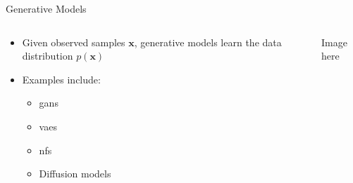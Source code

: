 \begin{frame}{Generative Models}
    \begin{columns}
        \begin{column}{0.5\linewidth}
            \small
            \begin{itemize}
                \item Given observed samples $\mathbf{x}$, generative models learn the data distribution $p(\mathbf{x})$
                \item Examples include:
                      \begin{itemize}
                          \item \acp{gan}
                          \item \acp{vae}
                          \item \acp{nf}
                          \item Diffusion models
                      \end{itemize}
            \end{itemize}
        \end{column}
        \begin{column}{0.5\linewidth}
            Image here
        \end{column}
    \end{columns}
\end{frame}